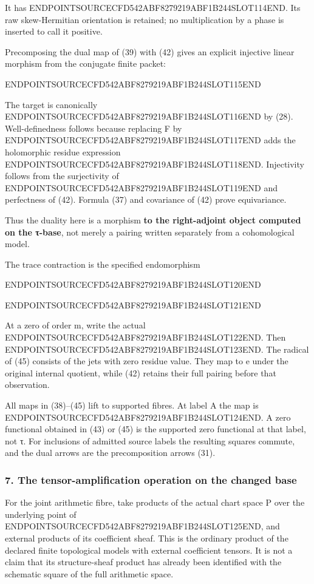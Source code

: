 It has ENDPOINTSOURCECFD542ABF8279219ABF1B244SLOT114END. Its raw skew-Hermitian orientation is retained; no multiplication by a phase is inserted to call it positive.

Precomposing the dual map of (39) with (42) gives an explicit injective linear morphism from the conjugate finite packet:

ENDPOINTSOURCECFD542ABF8279219ABF1B244SLOT115END

The target is canonically ENDPOINTSOURCECFD542ABF8279219ABF1B244SLOT116END by (28). Well-definedness follows because replacing F by ENDPOINTSOURCECFD542ABF8279219ABF1B244SLOT117END adds the holomorphic residue expression ENDPOINTSOURCECFD542ABF8279219ABF1B244SLOT118END. Injectivity follows from the surjectivity of ENDPOINTSOURCECFD542ABF8279219ABF1B244SLOT119END and perfectness of (42). Formula (37) and covariance of (42) prove equivariance.

Thus the duality here is a morphism \textbf{to the right-adjoint object computed on the τ-base}, not merely a pairing written separately from a cohomological model.

The trace contraction is the specified endomorphism

ENDPOINTSOURCECFD542ABF8279219ABF1B244SLOT120END

ENDPOINTSOURCECFD542ABF8279219ABF1B244SLOT121END

At a zero of order m, write the actual ENDPOINTSOURCECFD542ABF8279219ABF1B244SLOT122END. Then ENDPOINTSOURCECFD542ABF8279219ABF1B244SLOT123END. The radical of (45) consists of the jets with zero residue value. They map to e under the original internal quotient, while (42) retains their full pairing before that observation.

All maps in (38)--(45) lift to supported fibres. At label A the map is ENDPOINTSOURCECFD542ABF8279219ABF1B244SLOT124END. A zero functional obtained in (43) or (45) is the supported zero functional at that label, not τ. For inclusions of admitted source labels the resulting squares commute, and the dual arrows are the precomposition arrows (31).

\subsubsection{7. The tensor-amplification operation on the changed base}\label{endpoint-tau_base--the-tensor-amplification-operation-on-the-changed-base}

For the joint arithmetic fibre, take products of the actual chart space P over the underlying point of ENDPOINTSOURCECFD542ABF8279219ABF1B244SLOT125END, and external products of its coefficient sheaf. This is the ordinary product of the declared finite topological models with external coefficient tensors. It is not a claim that its structure-sheaf product has already been identified with the schematic square of the full arithmetic space.

